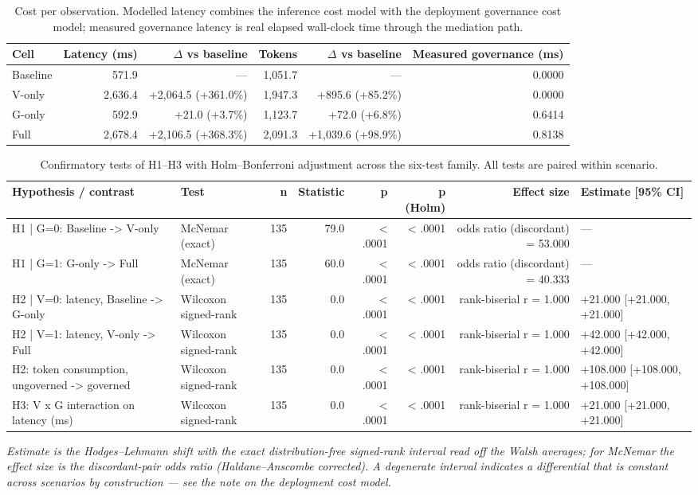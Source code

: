 \begin{table}[htbp]
\centering
\small
\caption{Cost per observation. Modelled latency combines the inference cost model with the deployment governance cost model; measured governance latency is real elapsed wall-clock time through the mediation path.}
\label{tab:gmais-3}
\begin{tabular}{lrrrrr}
\toprule
Cell & Latency (ms) & $\Delta$ vs baseline & Tokens & $\Delta$ vs baseline & Measured governance (ms) \\
\midrule
Baseline & 571.9 & --- & 1,051.7 & --- & 0.0000 \\
V-only & 2,636.4 & +2,064.5  (+361.0\%) & 1,947.3 & +895.6  (+85.2\%) & 0.0000 \\
G-only & 592.9 & +21.0  (+3.7\%) & 1,123.7 & +72.0  (+6.8\%) & 0.6414 \\
Full & 2,678.4 & +2,106.5  (+368.3\%) & 2,091.3 & +1,039.6  (+98.9\%) & 0.8138 \\
\bottomrule
\end{tabular}
\end{table}


\begin{table}[htbp]
\centering
\small
\caption{Confirmatory tests of H1–H3 with Holm–Bonferroni adjustment across the six-test family. All tests are paired within scenario.}
\label{tab:gmais-4}
\begin{tabular}{llrrrrrl}
\toprule
Hypothesis / contrast & Test & n & Statistic & p & p (Holm) & Effect size & Estimate [95\% CI] \\
\midrule
H1 | G=0: Baseline -> V-only & McNemar (exact) & 135 & 79.0 & < .0001 & < .0001 & odds ratio (discordant) = 53.000 & --- \\
H1 | G=1: G-only -> Full & McNemar (exact) & 135 & 60.0 & < .0001 & < .0001 & odds ratio (discordant) = 40.333 & --- \\
H2 | V=0: latency, Baseline -> G-only & Wilcoxon signed-rank & 135 & 0.0 & < .0001 & < .0001 & rank-biserial r = 1.000 & +21.000 [+21.000, +21.000] \\
H2 | V=1: latency, V-only -> Full & Wilcoxon signed-rank & 135 & 0.0 & < .0001 & < .0001 & rank-biserial r = 1.000 & +42.000 [+42.000, +42.000] \\
H2: token consumption, ungoverned -> governed & Wilcoxon signed-rank & 135 & 0.0 & < .0001 & < .0001 & rank-biserial r = 1.000 & +108.000 [+108.000, +108.000] \\
H3: V x G interaction on latency (ms) & Wilcoxon signed-rank & 135 & 0.0 & < .0001 & < .0001 & rank-biserial r = 1.000 & +21.000 [+21.000, +21.000] \\
\bottomrule
\end{tabular}
\par\vspace{2pt}\footnotesize\emph{Estimate is the Hodges–Lehmann shift with the exact distribution-free signed-rank interval read off the Walsh averages; for McNemar the effect size is the discordant-pair odds ratio (Haldane–Anscombe corrected). A degenerate interval indicates a differential that is constant across scenarios by construction --- see the note on the deployment cost model.}
\end{table}


